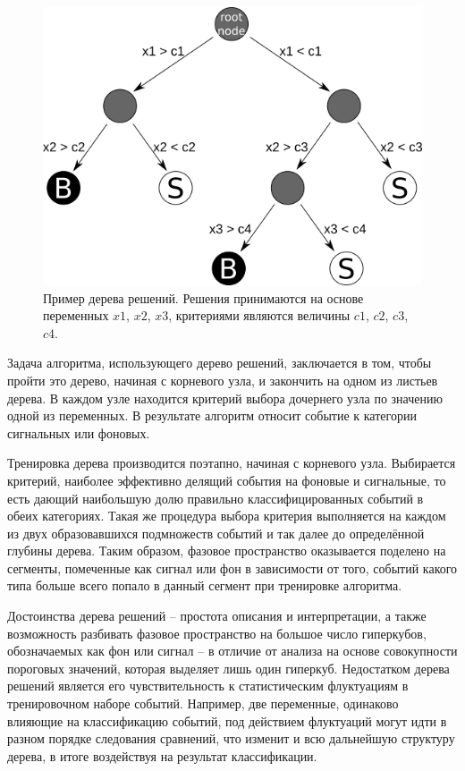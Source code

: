 \documentclass[14pt]{extarticle}
\begin{document}
\begin{figure}[h!]
	\centering
	\includegraphics[width=0.7\linewidth]{../pics/decision.png}
	\caption{Пример дерева решений. Решения принимаются на основе переменных $x1$, $x2$, $x3$, критериями являются величины $c1$, $c2$, $c3$, $c4$.}
	\label{fig:dectree}
\end{figure}
\newpage
Задача алгоритма, использующего дерево решений, заключается в том, чтобы пройти это дерево, начиная с корневого узла, и закончить на одном из листьев дерева. В каждом узле находится критерий выбора дочернего узла по значению одной из переменных. В результате алгоритм относит событие к категории сигнальных или фоновых.

Тренировка дерева производится поэтапно, начиная с корневого узла. Выбирается критерий, наиболее эффективно делящий события на фоновые и сигнальные, то есть дающий наибольшую долю правильно классифицированных событий в обеих категориях. Такая же процедура выбора критерия выполняется на каждом из двух образовавшихся подмножеств событий и так далее до определённой глубины дерева. Таким образом, фазовое пространство оказывается поделено на сегменты, помеченные как сигнал или фон в зависимости от того, событий какого типа больше всего попало в данный сегмент при тренировке алгоритма.

Достоинства дерева решений -- простота описания и интерпретации, а также возможность разбивать фазовое пространство на большое число гиперкубов, обозначаемых как фон или сигнал -- в отличие от анализа на основе совокупности пороговых значений, которая выделяет лишь один гиперкуб. Недостатком дерева решений является его чувствительность к статистическим флуктуациям в тренировочном наборе событий. Например, две переменные, одинаково влияющие на классификацию событий, под действием флуктуаций могут идти в разном порядке следования сравнений, что изменит и всю дальнейшую структуру дерева, в итоге воздействуя на результат классификации.
\end{document}

